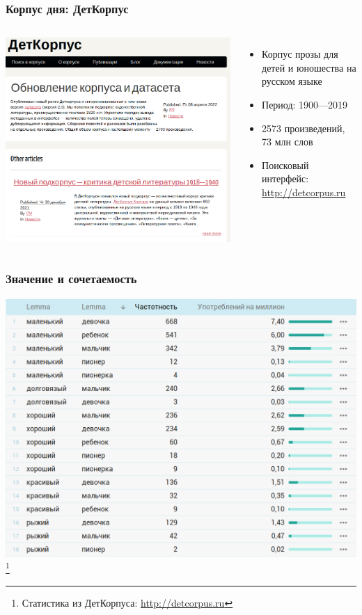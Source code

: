 \documentclass[svgnames]{beamer}
\begin{document}
\begin{frame}
  \frametitle{Корпус дня: ДетКорпус}
  \begin{columns}
    \includegraphics[width=\textwidth]{detcorpus.png}
    \begin{itemize}
    \item Корпус прозы для детей и юношества на русском языке
    \item Период: 1900—2019
    \item 2573 произведений, 73 млн слов
    \item Поисковый интерфейс: \href{http://detcorpus.ru}{http://detcorpus.ru}
    \end{itemize}
  \end{columns}
\end{frame}

\begin{frame}
  \frametitle{Значение и сочетаемость}
  \includegraphics[width=.9\textwidth]{adjectives.png}\footnote{Статистика
  из ДетКорпуса: \href{http://detcorpus.ru}{http://detcorpus.ru}}
\end{frame}
\end{document}
